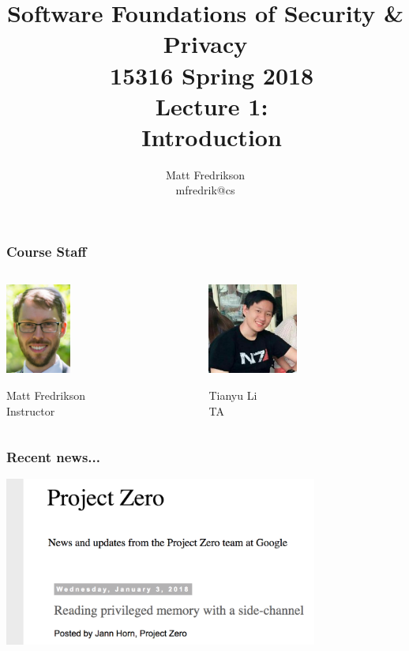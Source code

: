 \documentclass[10pt,handout]{beamer}
\title[Software Foundations of S \& P]{
\RaggedRight
	Software Foundations of Security \& Privacy \\
	\ 15316 Spring 2018 \\
	\ Lecture 1: \\
	\ Introduction
}
\author[Matt Fredrikson]{
	Matt Fredrikson \\
	mfredrik@cs
}
\begin{document}
\setlength\abovedisplayskip{5pt}
\setlength\belowdisplayskip{5pt}


\begin{frame}
\titlepage
\end{frame}


\begin{frame}

\frametitle{Course Staff}

\begin{columns}

\begin{column}{0.5\textwidth}
\centering
\includegraphics[height=8em]{matt.jpg}

Matt Fredrikson \\
Instructor
\end{column}

\begin{column}{0.5\textwidth}
\centering
\includegraphics[height=8em]{tianyu.jpg}

Tianyu Li \\
TA
\end{column}

\end{columns}

\end{frame}


\begin{frame}

\frametitle{Recent news...}

\centering
\includegraphics[height=15em]{sidechan-blog.png}

\end{frame}
\end{document}

